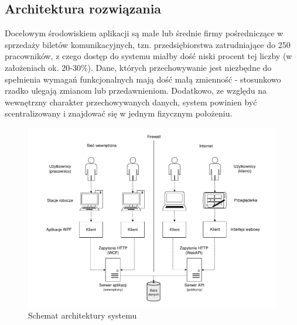 \documentclass[10pt,a4paper]{article}
\begin{document}
\subsection{Architektura rozwiązania}
\label{subsec:architecture}
Docelowym środowiskiem aplikacji są małe lub średnie firmy pośredniczące w sprzedaży biletów komunikacyjnych, tzn. przedsiębiorstwa zatrudniające do 250 pracowników, z czego dostęp do systemu miałby dość niski procent tej liczby (w założeniach ok. 20-30\%). Dane, których przechowywanie jest niezbędne do spełnienia wymagań funkcjonalnych mają dość małą zmienność - stosunkowo rzadko ulegają zmianom lub przedawnieniom. Dodatkowo, ze względu na wewnętrzny charakter przechowywanych danych, system powinien być scentralizowany i znajdować się w jednym fizycznym położeniu.
\begin{figure}[H]
	\centering
	\includegraphics[width=15.5cm]{Resources/PDF/architecture-global.pdf}
	\caption{Schemat architektury systemu}
\end{figure}
\end{document}
